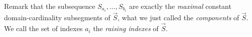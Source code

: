 \documentclass{lmcs}
\newtheorem{lemma}[theorem]{Lemma}
\newtheorem{definition}[theorem]{Definition}
\begin{document}
Remark that the subsequence $S_{a_{i}}, \ldots, S_{b_{i}}$ 
are exactly the \emph{maximal} constant domain-cardinality subsegments of $\vec{S}$,
what we just called the \emph{components} of $\vec{S}$.
We call the set of indexes $a_i$ the \emph{raising indexes} of $\vec{S}$.
%
%
%
%
%
%
%
%
%
%
%
\end{document}
